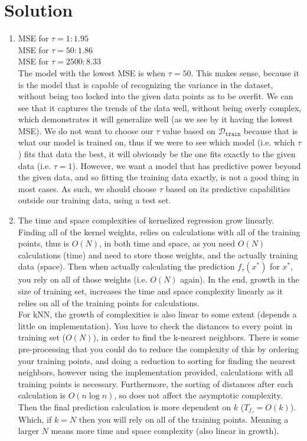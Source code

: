 \documentclass[submit]{harvardml}
\newenvironment{solution}
  {\color{blue}\section*{Solution}}
{}
\begin{document}
\begin{solution}
\begin{enumerate}
\begin{enumerate}
        \item 
        MSE for $\tau = 1: 1.95$
        \\MSE for $\tau = 50: 1.86$
        \\MSE for $\tau = 2500: 8.33$
        \\ The model with the lowest MSE is when $\tau = 50$. This makes sense, because it is the model that is capable of recognizing the variance in the dataset, without being too locked into the given data points as to be overfit. We can see that it captures the trends of the data well, without being overly complex, which demonstrates it will generalize well (as we see by it having the lowest MSE). We do not want to choose our $\tau$ value based on $\mathcal{D}_\texttt{train}$ because that is what our model is trained on, thus if we were to see which model (i.e. which $\tau$) fits that data the best, it will obviously be the one fits exactly to the given data (i.e. $\tau = 1$). However, we want a model that has predictive power beyond the given data, and so fitting the training data exactly, is not a good thing in most cases. As such, we should choose $\tau$ based on its predictive capabilities outside our training data, using a test set. 

        \item
        The time and space complexities of kernelized regression grow linearly. Finding all of the kernel weights, relies on calculations with all of the training points, thus is $O(N)$, in both time and space, as you need $O(N)$ calculations (time) and need to store those weights, and the actually training data  (space). Then when actually calculating the prediction $f_{\tau}(x^*)$ for $x^*$, you rely on all of those weights (i.e. $O(N)$ again). In the end, growth in the size of training set, increases the time and space complexity linearly as it relies on all of the training points for calculations. 
        \\ For kNN, the growth of complexities is also linear to some extent (depends a little on implementation). You have to check the distances to every point in training set ($O(N)$), in order to find the k-nearest neighbors. There is some pre-processing that you could do to reduce the complexity of this by ordering your training points, and doing a reduction to sorting for finding the nearest neighbors, however using the implementation provided, calculations with all training points is necessary. Furthermore, the sorting of distances after each calculation is $O(n\log n)$, so does not affect the asymptotic complexity. Then the final prediction calculation is more dependent on $k$ ($T_{f_{\tau}} = O(k)$). Which, if $k=N$ then you will rely on all of the training points. Meaning a larger $N$ means more time and space complexity (also linear in growth).


\end{enumerate}
\end{enumerate}
\end{solution}
\end{document}
